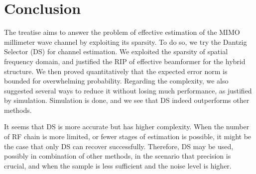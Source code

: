 
\chapter {Conclusion}

The treatise aims to answer the problem of effective estimation of the MIMO millimeter wave channel by exploiting its sparsity.
To do so, we try the Dantzig Selector (DS) for channel estimation.
We exploited the sparsity of spatial frequency domain, and justified the RIP of effective beamformer for the hybrid structure.
We then proved quantitatively that the expected error norm is bounded for overwhelming probability.
Regarding the complexity, we also suggested several ways to reduce it without losing much performance, as justified by simulation.
Simulation is done, and we see that DS indeed outperforms other methods.

It seems that DS is more accurate but has higher complexity.
When the number of RF chain is more limited, or fewer stages of estimation is possible, it might be the case that only DS can recover successfully.
Therefore, DS may be used, possibly in combination of other methods, in the scenario that precision is crucial, and when the sample is less sufficient and the noise level is higher.


